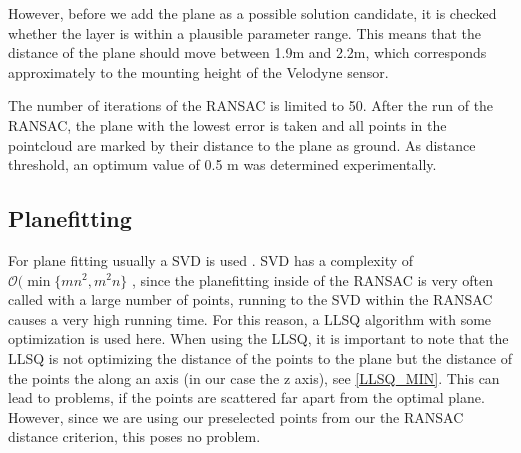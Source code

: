 \documentclass[11pt,oneside,openright]{mpreport}
\begin{document}
However, before we add the plane as a possible solution candidate, it is checked whether the layer is within a plausible parameter range.
This means that the distance of the plane should move between 1.9m and 2.2m, which corresponds approximately to the mounting height of the Velodyne sensor.

The number of iterations of the \ac{RANSAC} is limited to 50. After the run of the \ac{RANSAC}, the plane with the lowest error is taken and all points in the
pointcloud are marked by their distance to the plane as ground. As distance threshold, an optimum value of 0.5 m was determined experimentally.


\subsection{Planefitting}
\label{subssec:planefitting}



For plane fitting usually a \ac{SVD} is used \cite{Nurunnabi2012,Ram2007,Soderkvist2009}. SVD has a complexity of $\mathcal{O}(\min\{mn^2, m^2n\}$ \cite{Holmes2007}, since the planefitting inside
of the \ac{RANSAC} is very often called with a large number of points, running to the \ac{SVD} within the \ac{RANSAC} causes a very high running time.
For this reason, a \ac{LLSQ} algorithm with some optimization is used here.
When using the \ac{LLSQ}, it is important to note that the \ac{LLSQ} is not optimizing the distance of the points to the plane but the distance of the points the along an axis (in our case the z axis),
see \cref{LLSQ_MIN}. This can lead to problems, if the points are scattered far apart from the optimal plane. However, since we are using our preselected points from our the \ac{RANSAC}
distance criterion, this poses no problem.
\end{document}
